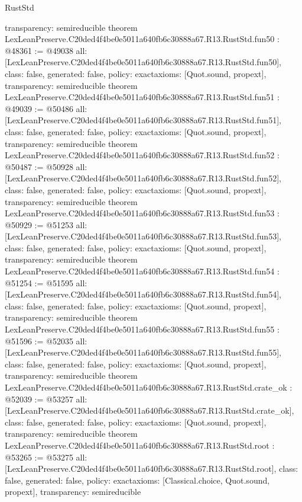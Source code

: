\begin{lexlean}{RustStd}
\begin{coremodule}
{  transparency: semireducible
}
theorem LexLeanPreserve.C20ded4f4be0e5011a640fb6c30888a67.R13.RustStd.fun50 : @48361 := @49038 {
  all: [LexLeanPreserve.C20ded4f4be0e5011a640fb6c30888a67.R13.RustStd.fun50],
  class: false,
  generated: false,
  policy: exact{axioms: [Quot.sound, propext]},
  transparency: semireducible
}
theorem LexLeanPreserve.C20ded4f4be0e5011a640fb6c30888a67.R13.RustStd.fun51 : @49039 := @50486 {
  all: [LexLeanPreserve.C20ded4f4be0e5011a640fb6c30888a67.R13.RustStd.fun51],
  class: false,
  generated: false,
  policy: exact{axioms: [Quot.sound, propext]},
  transparency: semireducible
}
theorem LexLeanPreserve.C20ded4f4be0e5011a640fb6c30888a67.R13.RustStd.fun52 : @50487 := @50928 {
  all: [LexLeanPreserve.C20ded4f4be0e5011a640fb6c30888a67.R13.RustStd.fun52],
  class: false,
  generated: false,
  policy: exact{axioms: [Quot.sound, propext]},
  transparency: semireducible
}
theorem LexLeanPreserve.C20ded4f4be0e5011a640fb6c30888a67.R13.RustStd.fun53 : @50929 := @51253 {
  all: [LexLeanPreserve.C20ded4f4be0e5011a640fb6c30888a67.R13.RustStd.fun53],
  class: false,
  generated: false,
  policy: exact{axioms: [Quot.sound, propext]},
  transparency: semireducible
}
theorem LexLeanPreserve.C20ded4f4be0e5011a640fb6c30888a67.R13.RustStd.fun54 : @51254 := @51595 {
  all: [LexLeanPreserve.C20ded4f4be0e5011a640fb6c30888a67.R13.RustStd.fun54],
  class: false,
  generated: false,
  policy: exact{axioms: [Quot.sound, propext]},
  transparency: semireducible
}
theorem LexLeanPreserve.C20ded4f4be0e5011a640fb6c30888a67.R13.RustStd.fun55 : @51596 := @52035 {
  all: [LexLeanPreserve.C20ded4f4be0e5011a640fb6c30888a67.R13.RustStd.fun55],
  class: false,
  generated: false,
  policy: exact{axioms: [Quot.sound, propext]},
  transparency: semireducible
}
theorem LexLeanPreserve.C20ded4f4be0e5011a640fb6c30888a67.R13.RustStd.crate_ok : @52039 := @53257 {
  all: [LexLeanPreserve.C20ded4f4be0e5011a640fb6c30888a67.R13.RustStd.crate_ok],
  class: false,
  generated: false,
  policy: exact{axioms: [Quot.sound, propext]},
  transparency: semireducible
}
theorem LexLeanPreserve.C20ded4f4be0e5011a640fb6c30888a67.R13.RustStd.root : @53265 := @53275 {
  all: [LexLeanPreserve.C20ded4f4be0e5011a640fb6c30888a67.R13.RustStd.root],
  class: false,
  generated: false,
  policy: exact{axioms: [Classical.choice, Quot.sound, propext]},
  transparency: semireducible
}


\end{coremodule}
\end{lexlean}
